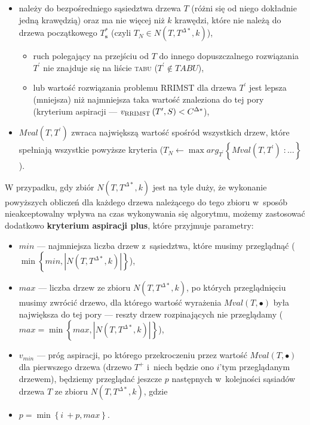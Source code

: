\begin{itemize}
	\item należy do bezpośredniego sąsiedztwa drzewa $T$ (różni się od niego dokładnie jedną krawędzią) oraz ma nie więcej niż $k$ krawędzi, które nie należą do drzewa początkowego $T^{\ast}_{\textbf{s}}$ (czyli $T_{N} \in N \left( T, T^{\Delta\ast}, k \right)$),
	\begin{itemize}
		\item ruch polegający na przejściu od $T$ do innego dopuszczalnego rozwiązania $T^{\prime}$ nie znajduje się na liście \textsc{tabu} ($T^{\prime} \notin TABU$),
		\item lub wartość rozwiązania problemu \textsc{RRIMST} dla drzewa $T^{\prime}$ jest lepsza (mniejsza) niż najmniejsza taka wartość znaleziona do tej pory (kryterium aspiracji --- $v_{\textsc{RRIMST}} \left( T^{\prime}, S \right) < C^{\Delta\ast}$), 
	\end{itemize}
	\item $Mval \left( T, T^{\prime} \right)$ zwraca największą wartość spośród wszystkich drzew, które spełniają wszystkie powyższe kryteria ($T_{N} \leftarrow \max arg_{T^{\prime}} \left\{ Mval \left( T, T^{\prime} \right) \; : \dots \right\}$).
\end{itemize}

W przypadku, gdy zbiór $N \left( T, T^{\Delta\ast}, k \right)$ jest na tyle duży, że wykonanie powyższych obliczeń dla każdego drzewa należącego do tego zbioru w~sposób nieakceptowalny wpływa na czas wykonywania się algorytmu, możemy zastosować dodatkowo \textbf{kryterium aspiracji plus}, które przyjmuje parametry:

\begin{itemize}
	\item $min$ --- najmniejsza liczba drzew z~sąsiedztwa, które musimy przeglądnąć ($\min \left\{ min, \left| N \left( T, T^{\Delta\ast}, k \right) \right| \right\}$),
	\item $max$ --- liczba drzew ze zbioru $N \left( T, T^{\Delta\ast}, k \right)$, po których przeglądnięciu musimy zwrócić drzewo, dla którego wartość wyrażenia $Mval \left( T, \bullet \right)$ była największa do tej pory --- reszty drzew rozpinających nie przeglądamy ($max = \min \left\{ max, \left| N \left( T, T^{\Delta\ast}, k \right) \right| \right\}$),
	\item $v_{min}$ --- próg aspiracji, po którego przekroczeniu przez wartość $Mval \left( T, \bullet \right)$ dla pierwszego drzewa (drzewo $T^{+}$ i~niech będzie ono $i$'tym przeglądanym drzewem), będziemy przeglądać jeszcze $p$ następnych w~kolejności sąsiadów drzewa $T$ ze zbioru $N \left( T, T^{\Delta\ast}, k \right)$, gdzie
	\item $p = \min \left\{ i~+ p, max \right\}$.
\end{itemize}


